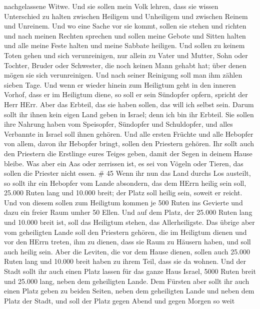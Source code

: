 nachgelassene Witwe.  Und sie sollen mein Volk lehren, dass
sie wissen Unterschied zu halten zwischen Heiligem und Unheiligem und
zwischen Reinem und Unreinem.  Und wo eine Sache vor sie
kommt, sollen sie stehen und richten und nach meinen Rechten sprechen
und sollen meine Gebote und Sitten halten und alle meine Feste halten
und meine Sabbate heiligen.  Und sollen zu keinem Toten
gehen und sich verunreinigen, nur allein zu Vater und Mutter, Sohn oder
Tochter, Bruder oder Schwester, die noch keinen Mann gehabt hat; über
denen mögen sie sich verunreinigen.  Und nach seiner
Reinigung soll man ihm zählen sieben Tage.  Und wenn er
wieder hinein zum Heiligtum geht in den inneren Vorhof, dass er im
Heiligtum diene, so soll er sein Sündopfer opfern, spricht der Herr
HErr.  Aber das Erbteil, das sie haben sollen, das will ich
selbst sein. Darum sollt ihr ihnen kein eigen Land geben in Israel; denn
ich bin ihr Erbteil.  Sie sollen ihre Nahrung haben vom
Speisopfer, Sündopfer und Schuldopfer, und alles Verbannte in Israel
soll ihnen gehören.  Und alle ersten Früchte und alle
Hebopfer von allem, davon ihr Hebopfer bringt, sollen den Priestern
gehören. Ihr sollt auch den Priestern die Erstlinge eures Teiges geben,
damit der Segen in deinem Hause bleibe.  Was aber ein Aas
oder zerrissen ist, es sei von Vögeln oder Tieren, das sollen die
Priester nicht essen. \# 45  Wenn ihr nun das Land durchs
Los austeilt, so sollt ihr ein Hebopfer vom Lande absondern, das dem
HErrn heilig sein soll, 25.000 Ruten lang und 10.000 breit; der Platz
soll heilig sein, soweit er reicht.  Und von diesem sollen
zum Heiligtum kommen je 500 Ruten ins Gevierte und dazu ein freier Raum
umher 50 Ellen.  Und auf dem Platz, der 25.000 Ruten lang
und 10.000 breit ist, soll das Heiligtum stehen, das Allerheiligste.
 Das übrige aber vom geheiligten Lande soll den Priestern
gehören, die im Heiligtum dienen und vor den HErrn treten, ihm zu
dienen, dass sie Raum zu Häusern haben, und soll auch heilig sein.
 Aber die Leviten, die vor dem Hause dienen, sollen auch
25.000 Ruten lang und 10.000 breit haben zu ihrem Teil, dass sie da
wohnen.  Und der Stadt sollt ihr auch einen Platz lassen für
das ganze Haus Israel, 5000 Ruten breit und 25.000 lang, neben dem
geheiligten Lande.  Dem Fürsten aber sollt ihr auch einen
Platz geben zu beiden Seiten, neben dem geheiligten Lande und neben dem
Platz der Stadt, und soll der Platz gegen Abend und gegen Morgen so weit
